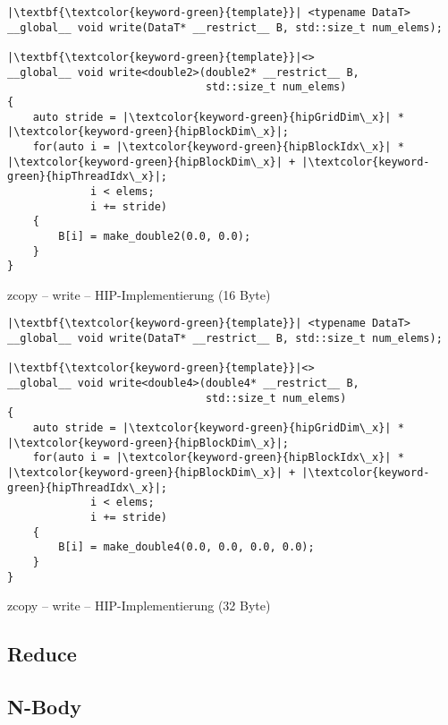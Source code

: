 \begin{code}
    \begin{verbatim}
|\textbf{\textcolor{keyword-green}{template}}| <typename DataT>
__global__ void write(DataT* __restrict__ B, std::size_t num_elems);

|\textbf{\textcolor{keyword-green}{template}}|<>
__global__ void write<double2>(double2* __restrict__ B,
                               std::size_t num_elems)
{
    auto stride = |\textcolor{keyword-green}{hipGridDim\_x}| * |\textcolor{keyword-green}{hipBlockDim\_x}|;
    for(auto i = |\textcolor{keyword-green}{hipBlockIdx\_x}| * |\textcolor{keyword-green}{hipBlockDim\_x}| + |\textcolor{keyword-green}{hipThreadIdx\_x}|;
             i < elems;
             i += stride)
    {
        B[i] = make_double2(0.0, 0.0);
    }
}
    \end{verbatim}
    \caption{zcopy -- write -- HIP-Implementierung (16 Byte)}
    \label{anhang:hip:zcopyw16}
\end{code}

\begin{code}
    \begin{verbatim}
|\textbf{\textcolor{keyword-green}{template}}| <typename DataT>
__global__ void write(DataT* __restrict__ B, std::size_t num_elems);

|\textbf{\textcolor{keyword-green}{template}}|<>
__global__ void write<double4>(double4* __restrict__ B,
                               std::size_t num_elems)
{
    auto stride = |\textcolor{keyword-green}{hipGridDim\_x}| * |\textcolor{keyword-green}{hipBlockDim\_x}|;
    for(auto i = |\textcolor{keyword-green}{hipBlockIdx\_x}| * |\textcolor{keyword-green}{hipBlockDim\_x}| + |\textcolor{keyword-green}{hipThreadIdx\_x}|;
             i < elems;
             i += stride)
    {
        B[i] = make_double4(0.0, 0.0, 0.0, 0.0);
    }
}
    \end{verbatim}
    \caption{zcopy -- write -- HIP-Implementierung (32 Byte)}
    \label{anhang:hip:zcopyw32}
\end{code}

\subsection{Reduce}
\subsection{N-Body}

